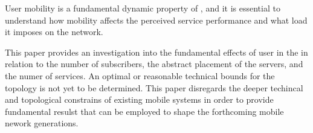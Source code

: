 User mobility is a fundamental dynamic property of \xcloud, and it is essential to understand how \ue mobility affects the perceived service performance and what load it imposes on the network. 

This paper provides an investigation into the fundamental effects of user \ue in the \xcloud in relation to the number of subscribers, the abstract placement of the servers, and the numer of services. An optimal or reasonable technical bounds for the \xcloud topology is not yet to be determined. This paper disregards the deeper techincal and topological constrains of existing mobile systems in order to provide fundamental resulst that can be employed to shape the forthcoming mobile nework generations.